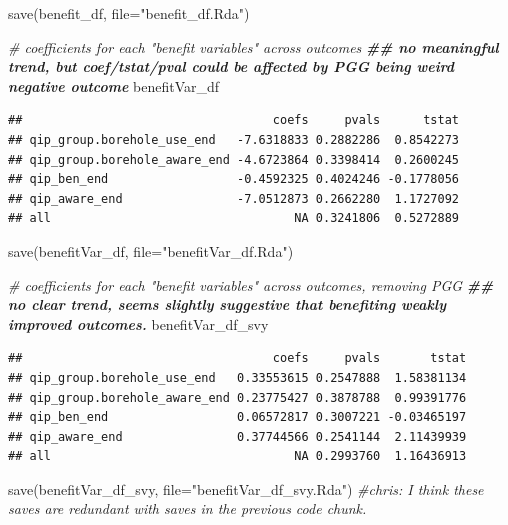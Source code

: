 \documentclass[
]{article}
\newenvironment{Shaded}{\begin{snugshade}}{\end{snugshade}}
\newcommand{\AttributeTok}[1]{\textcolor[rgb]{0.77,0.63,0.00}{#1}}
\newcommand{\CommentTok}[1]{\textcolor[rgb]{0.56,0.35,0.01}{\textit{#1}}}
\newcommand{\DocumentationTok}[1]{\textcolor[rgb]{0.56,0.35,0.01}{\textbf{\textit{#1}}}}
\newcommand{\FunctionTok}[1]{\textcolor[rgb]{0.00,0.00,0.00}{#1}}
\newcommand{\NormalTok}[1]{#1}
\newcommand{\StringTok}[1]{\textcolor[rgb]{0.31,0.60,0.02}{#1}}
\begin{document}
\begin{Shaded}
\begin{Highlighting}[]
\FunctionTok{save}\NormalTok{(benefit\_df, }\AttributeTok{file=}\StringTok{"benefit\_df.Rda"}\NormalTok{)}

\CommentTok{\# coefficients for each "benefit variables" across outcomes}
\DocumentationTok{\#\# no meaningful trend, but coef/tstat/pval could be affected by PGG being weird negative outcome}
\NormalTok{benefitVar\_df}
\end{Highlighting}
\end{Shaded}

\begin{verbatim}
##                                   coefs     pvals      tstat
## qip_group.borehole_use_end   -7.6318833 0.2882286  0.8542273
## qip_group.borehole_aware_end -4.6723864 0.3398414  0.2600245
## qip_ben_end                  -0.4592325 0.4024246 -0.1778056
## qip_aware_end                -7.0512873 0.2662280  1.1727092
## all                                  NA 0.3241806  0.5272889
\end{verbatim}

\begin{Shaded}
\begin{Highlighting}[]
\FunctionTok{save}\NormalTok{(benefitVar\_df, }\AttributeTok{file=}\StringTok{"benefitVar\_df.Rda"}\NormalTok{)}

\CommentTok{\# coefficients for each "benefit variables" across outcomes, removing PGG}
\DocumentationTok{\#\# no clear trend, seems slightly suggestive that benefiting weakly improved outcomes.}
\NormalTok{benefitVar\_df\_svy}
\end{Highlighting}
\end{Shaded}

\begin{verbatim}
##                                   coefs     pvals       tstat
## qip_group.borehole_use_end   0.33553615 0.2547888  1.58381134
## qip_group.borehole_aware_end 0.23775427 0.3878788  0.99391776
## qip_ben_end                  0.06572817 0.3007221 -0.03465197
## qip_aware_end                0.37744566 0.2541144  2.11439939
## all                                  NA 0.2993760  1.16436913
\end{verbatim}

\begin{Shaded}
\begin{Highlighting}[]
\FunctionTok{save}\NormalTok{(benefitVar\_df\_svy, }\AttributeTok{file=}\StringTok{"benefitVar\_df\_svy.Rda"}\NormalTok{)}
\CommentTok{\#chris: I think these saves are redundant with saves in the previous code chunk.}
\end{Highlighting}
\end{Shaded}
\end{document}
